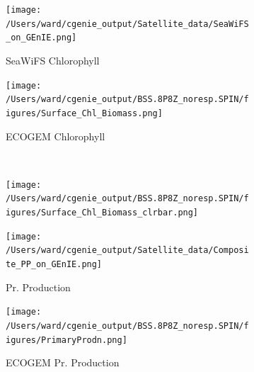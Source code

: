 \documentclass[gmd, manuscript]{copernicus}
\providecommand{\DIFaddbeginFL}{} %
\providecommand{\DIFaddendFL}{} %
\providecommand{\DIFdelbeginFL}{} %
\providecommand{\DIFdelendFL}{} %
\begin{document}
\begin{figure}[htbp]
\begin{subfigure}{.5\textwidth}
\centering
 \caption{SeaWiFS Chlorophyll}
\DIFdelbeginFL %
\DIFdelendFL \DIFaddbeginFL \texttt{[image: /Users/ward/cgenie\_output/Satellite\_data/SeaWiFS\_on\_GEnIE.png]}
\DIFaddendFL \end{subfigure}%
\begin{subfigure}{.5\textwidth}
\centering
 \caption{ECOGEM Chlorophyll}
\DIFdelbeginFL %
\DIFdelendFL \DIFaddbeginFL \texttt{[image: /Users/ward/cgenie\_output/BSS.8P8Z\_noresp.SPIN/figures/Surface\_Chl\_Biomass.png]}
\DIFaddendFL \end{subfigure}%
\\[+0.2cm]
\begin{subfigure}{.5\textwidth}
 \centering
 \DIFdelbeginFL %
\DIFdelendFL \DIFaddbeginFL \texttt{[image: /Users/ward/cgenie\_output/BSS.8P8Z\_noresp.SPIN/figures/Surface\_Chl\_Biomass\_clrbar.png]}
\DIFaddendFL \end{subfigure}
\begin{subfigure}{.5\textwidth}
\centering
 \caption{\citet{Yool:2013a} Pr. Production}
\DIFdelbeginFL %
\DIFdelendFL \DIFaddbeginFL \texttt{[image: /Users/ward/cgenie\_output/Satellite\_data/Composite\_PP\_on\_GEnIE.png]}
\DIFaddendFL \end{subfigure}%
\begin{subfigure}{.5\textwidth}
\centering
 \caption{ECOGEM Pr. Production}
\DIFdelbeginFL %
\DIFdelendFL \DIFaddbeginFL \texttt{[image: /Users/ward/cgenie\_output/BSS.8P8Z\_noresp.SPIN/figures/PrimaryProdn.png]}
\DIFaddendFL \end{subfigure}%
\\[+0.2cm]
\begin{subfigure}{.5\textwidth}
 \centering
 \DIFdelbeginFL %

\end{subfigure}
\end{figure}
\end{document}
